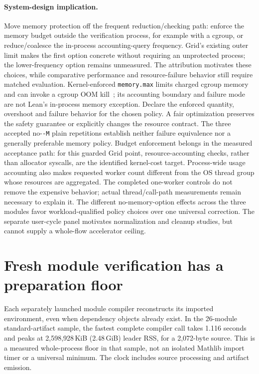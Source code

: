 \documentclass[10pt,twocolumn]{article}
\begin{document}
\paragraph{System-design implication.}
Move memory protection off the frequent reduction/checking path:
enforce the memory budget outside the verification process, for example
with a cgroup, or reduce/coalesce the in-process accounting-query frequency.
Grid's existing outer limit makes the first option concrete without
requiring an unprotected process; the lower-frequency option remains
unmeasured.
The attribution motivates these choices, while comparative performance and
resource-failure behavior still require matched evaluation.
Kernel-enforced \texttt{memory.max} limits charged cgroup memory and can
invoke a cgroup OOM kill~\cite{cgroupV2Memory2026}; its accounting boundary
and failure mode are not Lean's in-process memory exception.
Declare the enforced quantity, overshoot and failure behavior for the chosen
policy. A fair optimization preserves the safety guarantee or explicitly
changes the resource contract.
The three accepted no-\texttt{-M} plain repetitions establish neither
failure equivalence nor a generally preferable memory policy.
Budget enforcement belongs in the measured acceptance path: for this
guarded Grid point, resource-accounting checks, rather than allocator
syscalls, are the identified kernel-cost target.
Process-wide usage accounting also makes requested worker count different
from the OS thread group whose resources are aggregated.
The completed one-worker controls do not remove the expensive behavior;
actual thread/call-path measurements remain necessary to explain it.
The different no-memory-option effects across the three modules favor
workload-qualified policy choices over one universal correction.
The separate user-cycle panel motivates normalization and cleanup studies,
but cannot supply a whole-flow accelerator ceiling.


\section{Fresh module verification has a preparation floor}
\label{sec:imports}
Each separately launched module compiler reconstructs its imported
environment, even when dependency objects already exist.
In the 26-module standard-artifact sample, the fastest complete compiler
call takes 1.116 seconds and peaks at 2,598,928\,KiB
(2.48\,GiB) leader RSS, for a 2,072-byte source.
This is a measured whole-process floor in that sample, not an isolated
Mathlib import timer or a universal minimum.
The clock includes source processing and artifact emission.
\end{document}
